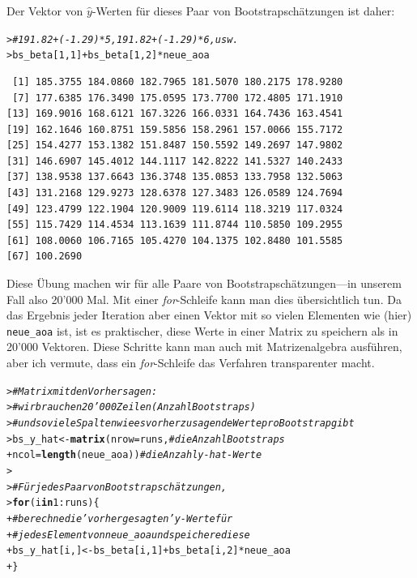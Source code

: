 \documentclass[oneside, 10pt]{book}\usepackage[]{graphicx}\usepackage[]{xcolor}
\makeatletter
\newcommand{\hlnum}[1]{\textcolor[rgb]{0.686,0.059,0.569}{#1}}%
\newcommand{\hlcom}[1]{\textcolor[rgb]{0.678,0.584,0.686}{\textit{#1}}}%
\newcommand{\hlopt}[1]{\textcolor[rgb]{0,0,0}{#1}}%
\newcommand{\hlstd}[1]{\textcolor[rgb]{0.345,0.345,0.345}{#1}}%
\newcommand{\hlkwa}[1]{\textcolor[rgb]{0.161,0.373,0.58}{\textbf{#1}}}%
\newcommand{\hlkwb}[1]{\textcolor[rgb]{0.69,0.353,0.396}{#1}}%
\newcommand{\hlkwc}[1]{\textcolor[rgb]{0.333,0.667,0.333}{#1}}%
\newcommand{\hlkwd}[1]{\textcolor[rgb]{0.737,0.353,0.396}{\textbf{#1}}}%
\newenvironment{kframe}{%
 \def\at@end@of@kframe{}%
 \ifinner\ifhmode%
  \def\at@end@of@kframe{\end{minipage}}%
  \begin{minipage}{\columnwidth}%
 \fi\fi%
 \def\FrameCommand##1{\hskip\@totalleftmargin \hskip-\fboxsep
 \colorbox{shadecolor}{##1}\hskip-\fboxsep
     \hskip-\linewidth \hskip-\@totalleftmargin \hskip\columnwidth}%
 \MakeFramed {\advance\hsize-\width
   \@totalleftmargin\z@ \linewidth\hsize
   \@setminipage}}%
 {\par\unskip\endMakeFramed%
 \at@end@of@kframe}
\newenvironment{knitrout}{}{} %
\makeatother
\begin{document}
Der Vektor von $\widehat{y}$-Werten für dieses Paar
von Bootstrapschätzungen ist daher:
\begin{knitrout}
\color{fgcolor}\begin{kframe}
\begin{alltt}
\hlstd{> }\hlcom{# 191.82 + (-1.29) * 5, 191.82 + (-1.29) * 6, usw.}
\hlstd{> }\hlstd{bs_beta[}\hlnum{1}\hlstd{,} \hlnum{1}\hlstd{]} \hlopt{+} \hlstd{bs_beta[}\hlnum{1}\hlstd{,} \hlnum{2}\hlstd{]} \hlopt{*} \hlstd{neue_aoa}
\end{alltt}
\begin{verbatim}
 [1] 185.3755 184.0860 182.7965 181.5070 180.2175 178.9280
 [7] 177.6385 176.3490 175.0595 173.7700 172.4805 171.1910
[13] 169.9016 168.6121 167.3226 166.0331 164.7436 163.4541
[19] 162.1646 160.8751 159.5856 158.2961 157.0066 155.7172
[25] 154.4277 153.1382 151.8487 150.5592 149.2697 147.9802
[31] 146.6907 145.4012 144.1117 142.8222 141.5327 140.2433
[37] 138.9538 137.6643 136.3748 135.0853 133.7958 132.5063
[43] 131.2168 129.9273 128.6378 127.3483 126.0589 124.7694
[49] 123.4799 122.1904 120.9009 119.6114 118.3219 117.0324
[55] 115.7429 114.4534 113.1639 111.8744 110.5850 109.2955
[61] 108.0060 106.7165 105.4270 104.1375 102.8480 101.5585
[67] 100.2690
\end{verbatim}
\end{kframe}
\end{knitrout}

Diese Übung machen wir für alle Paare von
Bootstrapschätzungen---in unserem Fall also 20'000 Mal.
Mit einer \textit{for}-Schleife kann man dies übersichtlich tun.
Da das Ergebnis jeder Iteration aber einen Vektor
mit so vielen Elementen wie (hier) \texttt{neue\_aoa} ist,
ist es praktischer, diese Werte in einer Matrix zu speichern
als in 20'000 Vektoren. Diese Schritte kann man auch mit
Matrizenalgebra ausführen, aber ich vermute, dass ein
\textit{for}-Schleife das Verfahren transparenter macht.
\begin{knitrout}
\color{fgcolor}\begin{kframe}
\begin{alltt}
\hlstd{> }\hlcom{# Matrix mit den Vorhersagen:}
\hlstd{> }\hlcom{# wir brauchen 20'000 Zeilen (Anzahl Bootstraps)}
\hlstd{> }\hlcom{# und so viele Spalten wie es vorherzusagende Werte pro Bootstrap gibt}
\hlstd{> }\hlstd{bs_y_hat} \hlkwb{<-} \hlkwd{matrix}\hlstd{(}\hlkwc{nrow} \hlstd{= runs,} \hlcom{# die Anzahl Bootstraps}
\hlstd{+ }                   \hlkwc{ncol} \hlstd{=} \hlkwd{length}\hlstd{(neue_aoa))} \hlcom{# die Anzahl y-hat-Werte}
\hlstd{> }
\hlstd{> }\hlcom{# Für jedes Paar von Bootstrapschätzungen,}
\hlstd{> }\hlkwa{for} \hlstd{(i} \hlkwa{in} \hlnum{1}\hlopt{:}\hlstd{runs) \{}
\hlstd{+ }  \hlcom{# berechne die 'vorhergesagten' y-Werte für}
\hlstd{+ }  \hlcom{# jedes Element von neue_aoa und speichere diese}
\hlstd{+ }  \hlstd{bs_y_hat[i, ]} \hlkwb{<-} \hlstd{bs_beta[i,} \hlnum{1}\hlstd{]} \hlopt{+} \hlstd{bs_beta[i,} \hlnum{2}\hlstd{]}\hlopt{*}\hlstd{neue_aoa}
\hlstd{+ }\hlstd{\}}
\end{alltt}
\end{kframe}
\end{knitrout}
\end{document}
